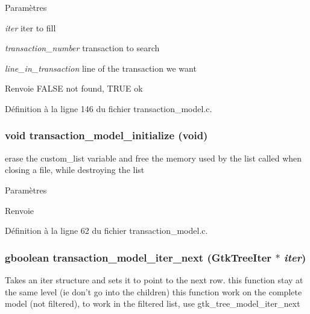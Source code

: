 \begin{DoxyParams}{Paramètres}
\item[{\em iter}]iter to fill \item[{\em transaction\_\-number}]transaction to search \item[{\em line\_\-in\_\-transaction}]line of the transaction we want\end{DoxyParams}
\begin{DoxyReturn}{Renvoie}
FALSE not found, TRUE ok 
\end{DoxyReturn}


Définition à la ligne 146 du fichier transaction\_\-model.c.

\subsubsection[{transaction\_\-model\_\-initialize}]{\setlength{\rightskip}{0pt plus 5cm}void transaction\_\-model\_\-initialize (void)}\label{transaction__model_8h_ad2a7f1004a5b27450f8fc159f74351dc}
erase the custom\_\-list variable and free the memory used by the list called when closing a file, while destroying the list


\begin{DoxyParams}{Paramètres}
\item[{\em }]\end{DoxyParams}
\begin{DoxyReturn}{Renvoie}

\end{DoxyReturn}


Définition à la ligne 62 du fichier transaction\_\-model.c.

\subsubsection[{transaction\_\-model\_\-iter\_\-next}]{\setlength{\rightskip}{0pt plus 5cm}gboolean transaction\_\-model\_\-iter\_\-next (GtkTreeIter $\ast$ {\em iter})}\label{transaction__model_8h_a2fd3b631729b3a7c5fd463d06f511b7b}
Takes an iter structure and sets it to point to the next row. this function stay at the same level (ie don't go into the children) this function work on the complete model (not filtered), to work in the filtered list, use gtk\_\-tree\_\-model\_\-iter\_\-next


